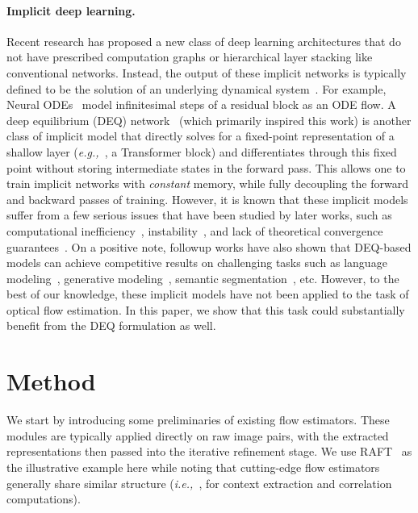 \documentclass[10pt,twocolumn,letterpaper]{article}
\def\ie{\textit{i.e.,~}}
\def\eg{\textit{e.g.,~}}
\begin{document}
\vspace{-.25cm}
\paragraph{Implicit deep learning.} Recent research has proposed a new class of deep learning architectures that do not have prescribed computation graphs or hierarchical layer stacking like conventional networks. Instead, the output of these implicit networks is typically defined to be the solution of an underlying dynamical system~\citep{Kolter2020,amos2017optnet,chen2018neural,DEQ,elghaoui2019implicit,Ham}. For example, Neural ODEs~\citep{chen2018neural} model infinitesimal steps of a residual block as an ODE flow. A deep equilibrium (DEQ) network~\citep{DEQ} (which primarily inspired this work) is another class of implicit model that directly solves for a fixed-point representation of a shallow layer  (\eg, a Transformer block) and differentiates through this fixed point without storing intermediate states in the forward pass. This allows one to train implicit networks with \emph{constant} memory, while fully decoupling the forward and backward passes of training. However, it is known that these implicit models suffer from a few serious issues that have been studied by later works, such as computational inefficiency~\citep{chen2018neural,dupont2019augmented}, instability~\citep{chen2018neural,DEQ,DEQ_JR}, and lack of theoretical convergence guarantees~\citep{kawaguchi2020theory,MON}. On a positive note, followup works have also shown that DEQ-based models can achieve competitive results on challenging tasks such as language modeling~\citep{DEQ}, generative modeling~\citep{lu2021implicit}, semantic segmentation~\citep{MDEQ}, etc. However, to the best of our knowledge, these implicit models have not been applied to the task of optical flow estimation. In this paper, we show that this task could substantially benefit from the DEQ formulation as well.

\section{Method}
\label{sec:method}

We start by introducing some preliminaries of existing flow estimators. These modules are typically applied directly on raw image pairs, with the extracted representations then passed into the iterative refinement stage. We use RAFT~\cite{RAFT} as the illustrative example here while noting that cutting-edge flow estimators generally share similar structure (\ie, for context extraction and correlation computations).
\end{document}
